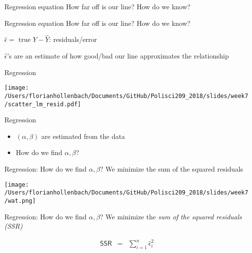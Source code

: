 \documentclass[presentation]{beamer}
\begin{document}
\begin{frame}[label={sec:orga31a047}]{Regression equation}
\Large{How far off is our line? How do we know?}
\end{frame}


\begin{frame}[label={sec:org0790a2d}]{Regression equation}
How far off is our line? How do we know?

\pause
\(\hat\epsilon = \text{ true } Y - \widehat{Y}\): residuals/error

\(\hat\epsilon\)'s are an estimate of how good/bad our line approximates the relationship
\end{frame}

\begin{frame}[label={sec:org30e7111}]{Regression}
\begin{center}
\texttt{[image: /Users/florianhollenbach/Documents/GitHub/Polisci209\_2018/slides/week7/scatter\_lm\_resid.pdf]}
\end{center}
\end{frame}



\begin{frame}[label={sec:orgc413d4e}]{Regression}
\begin{itemize}
\item \((\alpha, \beta)\) are estimated from the data
\item How do we find \(\alpha, \beta\)?
\end{itemize}
\end{frame}

\begin{frame}[label={sec:org961fed5}]{Regression: How do we find \(\alpha, \beta\)?}
\alert{We minimize the sum of the squared residuals}

\begin{center}
\texttt{[image: /Users/florianhollenbach/Documents/GitHub/Polisci209\_2018/slides/week7/wat.png]}
\end{center}
\end{frame}



\begin{frame}[label={sec:orgc16bb9f}]{Regression: How do we find \(\alpha, \beta\)?}
\alert{We minimize the \emph{sum of the squared residuals (SSR)}}

\begin{eqnarray*}
\textsf{SSR} & = & \sum_{i=1}^n \hat\epsilon_i^2
\end{eqnarray*}
\end{frame}
\end{document}
